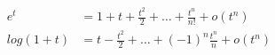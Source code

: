\begin{align*} 
	e^t & =  1 + t + \frac{t^2}{2} +\ldots + \frac{t^n}{n!} + o(t^n) \\
log (1 + t)& = t - \frac{t^2}{2} + \ldots + (-1)^n \frac{t^n}{ n} + o(t^n) \\
\end{align*}
%
